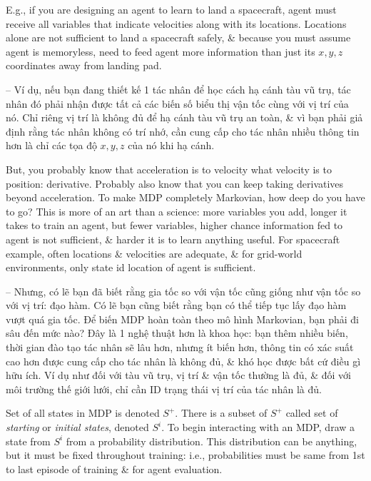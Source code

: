 \documentclass{article}
\begin{document}
\begin{itemize}
\begin{itemize}
        E.g., if you are designing an agent to learn to land a spacecraft, agent must receive all variables that indicate velocities along with its locations. Locations alone are not sufficient to land a spacecraft safely, \& because you must assume agent is memoryless, need to feed agent more information than just its $x,y,z$ coordinates away from landing pad.

        -- Ví dụ, nếu bạn đang thiết kế 1 tác nhân để học cách hạ cánh tàu vũ trụ, tác nhân đó phải nhận được tất cả các biến số biểu thị vận tốc cùng với vị trí của nó. Chỉ riêng vị trí là không đủ để hạ cánh tàu vũ trụ an toàn, \& vì bạn phải giả định rằng tác nhân không có trí nhớ, cần cung cấp cho tác nhân nhiều thông tin hơn là chỉ các tọa độ $x,y,z$ của nó khi hạ cánh.

        But, you probably know that acceleration is to velocity what velocity is to position: derivative. Probably also know that you can keep taking derivatives beyond acceleration. To make MDP completely Markovian, how deep do you have to go? This is more of an art than a science: more variables you add, longer it takes to train an agent, but fewer variables, higher chance information fed to agent is not sufficient, \& harder it is to learn anything useful. For spacecraft example, often locations \& velocities are adequate, \& for grid-world environments, only state id location of agent is sufficient.

        -- Nhưng, có lẽ bạn đã biết rằng gia tốc so với vận tốc cũng giống như vận tốc so với vị trí: đạo hàm. Có lẽ bạn cũng biết rằng bạn có thể tiếp tục lấy đạo hàm vượt quá gia tốc. Để biến MDP hoàn toàn theo mô hình Markovian, bạn phải đi sâu đến mức nào? Đây là 1 nghệ thuật hơn là khoa học: bạn thêm nhiều biến, thời gian đào tạo tác nhân sẽ lâu hơn, nhưng ít biến hơn, thông tin có xác suất cao hơn được cung cấp cho tác nhân là không đủ, \& khó học được bất cứ điều gì hữu ích. Ví dụ như đối với tàu vũ trụ, vị trí \& vận tốc thường là đủ, \& đối với môi trường thế giới lưới, chỉ cần ID trạng thái vị trí của tác nhân là đủ.

        Set of all states in MDP is denoted $S^+$. There is a subset of $S^+$ called set of {\it starting} or {\it initial states}, denoted $S^i$. To begin interacting with an MDP, draw a state from $S^i$ from a probability distribution. This distribution can be anything, but it must be fixed throughout training: i.e., probabilities must be same from 1st to last episode of training \& for agent evaluation.


\end{itemize}
\end{itemize}
\end{document}
